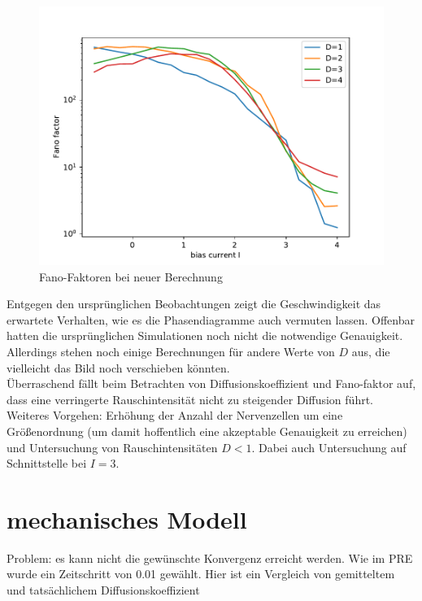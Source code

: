 \documentclass[12pt,a4paper]{article}
\begin{document}
\begin{figure}[H]
	\centering
	\includegraphics[scale=0.9]{fneur.pdf} 
	\caption{Fano-Faktoren bei neuer Berechnung}
	\label{fn}
\end{figure} 
Entgegen den ursprünglichen Beobachtungen zeigt die Geschwindigkeit das erwartete Verhalten, wie es die Phasendiagramme auch vermuten lassen. Offenbar hatten die ursprünglichen Simulationen noch nicht die notwendige Genauigkeit. Allerdings stehen noch einige Berechnungen für andere Werte von $D$ aus, die vielleicht das Bild noch verschieben könnten.\\
Überraschend fällt beim Betrachten von Diffusionskoeffizient und Fano-faktor auf, dass eine verringerte Rauschintensität nicht zu steigender Diffusion führt. \\
Weiteres Vorgehen: Erhöhung der Anzahl der Nervenzellen um eine Größenordnung (um damit hoffentlich eine akzeptable Genauigkeit zu erreichen) und Untersuchung von Rauschintensitäten $D<1$. Dabei auch Untersuchung auf Schnittstelle bei $I=3$. 
\section{mechanisches Modell}
Problem: es kann nicht die gewünschte Konvergenz erreicht werden. Wie im PRE wurde ein Zeitschritt von 0.01 gewählt.
Hier ist ein Vergleich von gemitteltem und tatsächlichem Diffusionskoeffizient
\end{document}
